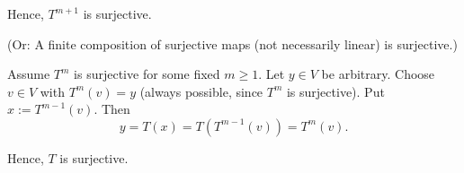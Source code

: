 \begin{xrcs}
\begin{xprf}
\begin{enumerate}
{        Hence, $T^{m+1}$ is surjective.

        (Or: A finite composition of surjective maps (not necessarily linear) is surjective.)

        \Leftarrowdirection Assume $T^m$ is surjective for some fixed $m\ge 1$. Let $y\in V$ be arbitrary. Choose $v\in V$ with $T^m(v)=y$ (always possible, since $T^m$ is surjective). Put $x:=T^{m-1}(v)$. Then
        \begin{equation}
          y=T(x)=T(T^{m-1}(v))=T^m(v).
        \end{equation}

        Hence, $T$ is surjective.
      }
    \end{enumerate}
  \end{xprf}
\end{xrcs}

